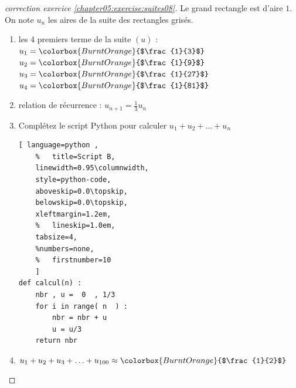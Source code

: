 \documentclass[main.tex]{subfiles}
\begin{document}
\begin{proof}[correction exercice \ref{chapter05:exercise:suites08}] \hfill Le grand rectangle est d'aire $1$. On note $u_n$ les aires de la suite des rectangles grisés. 
	
\noindent
\begin{minipage}{0.62\linewidth} 

\begin{enumerate}[label=\arabic*),leftmargin=*]
	 \item les 4 premiers terme de la suite $(u)$ :\\
	$u_1=\colorbox{BurntOrange}{$\frac{1}{3}$}$\dotfill $u_2=\colorbox{BurntOrange}{$\frac{1}{9}$}$\dotfill $u_3=\colorbox{BurntOrange}{$\frac{1}{27}$}$\dotfill $u_4=\colorbox{BurntOrange}{$\frac{1}{81}$}$\dotfill 
	\item  relation de récurrence : \colorbox{BurntOrange}{$u_{n+1}=\frac{1}{3}u_n$} 
	\item Complétez le script Python pour calculer $u_1+u_2+\ldots+u_n$ 
\begin{lstlisting}[ language=python , 
	%	title=Script B,   
	linewidth=0.95\columnwidth,
	style=python-code,    
	aboveskip=0.0\topskip,
	belowskip=0.0\topskip,
	xleftmargin=1.2em,
	%	lineskip=1.0em,
	tabsize=4, 
	%numbers=none,
	%	firstnumber=10  
	] 
def calcul(n) :
	nbr , u =  0  , 1/3
	for i in range( n  ) :
		nbr = nbr + u
		u = u/3
	return nbr
\end{lstlisting}
	\item  $u_1+u_2+u_3+\ldots +u_{100}\approx \colorbox{BurntOrange}{$\frac{1}{2}$}$
\end{enumerate}	 
\end{minipage} 
\hfill 
\begin{minipage}{0.35\linewidth} \centering
{}
\end{minipage}
\end{proof}
\end{document}
